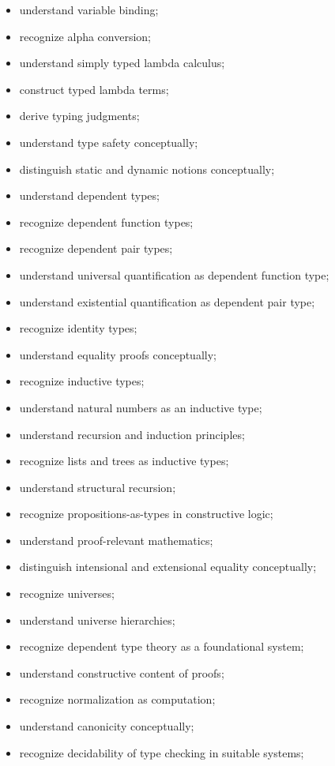 {\begin{itemize}
    \item understand variable binding;
    \item recognize alpha conversion;
    \item understand simply typed lambda calculus;
    \item construct typed lambda terms;
    \item derive typing judgments;
    \item understand type safety conceptually;
    \item distinguish static and dynamic notions conceptually;
    \item understand dependent types;
    \item recognize dependent function types;
    \item recognize dependent pair types;
    \item understand universal quantification as dependent function type;
    \item understand existential quantification as dependent pair type;
    \item recognize identity types;
    \item understand equality proofs conceptually;
    \item recognize inductive types;
    \item understand natural numbers as an inductive type;
    \item understand recursion and induction principles;
    \item recognize lists and trees as inductive types;
    \item understand structural recursion;
    \item recognize propositions-as-types in constructive logic;
    \item understand proof-relevant mathematics;
    \item distinguish intensional and extensional equality conceptually;
    \item recognize universes;
    \item understand universe hierarchies;
    \item recognize dependent type theory as a foundational system;
    \item understand constructive content of proofs;
    \item recognize normalization as computation;
    \item understand canonicity conceptually;
    \item recognize decidability of type checking in suitable systems;

\end{itemize}}
